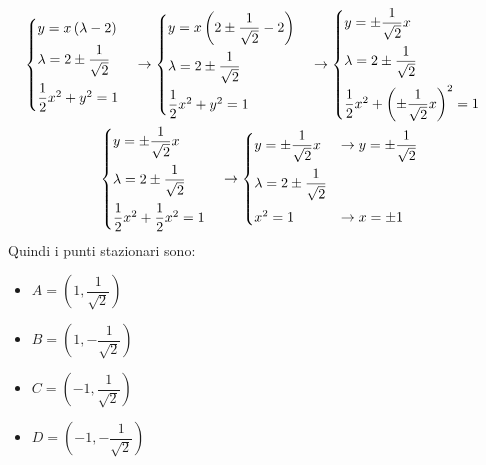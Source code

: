 \documentclass[a4paper]{article}
\begin{document}
	\begin{gather*}
		\begin{cases}
			y = x\left(\lambda - 2\right) \vspace{.5em}\\
			\lambda = 2 \pm \dfrac{1}{\sqrt{2}} \vspace{.5em}\\
			\dfrac{1}{2}x^{2} + y^{2} = 1
		\end{cases}
		\rightarrow
		\begin{cases}
			y = x\left(2 \pm \dfrac{1}{\sqrt{2}} - 2\right) \vspace{.5em}\\
			\lambda = 2 \pm \dfrac{1}{\sqrt{2}} \vspace{.5em}\\
			\dfrac{1}{2}x^{2} + y^{2} = 1
		\end{cases}
		\rightarrow
		\begin{cases}
			y = \pm \dfrac{1}{\sqrt{2}}x \vspace{.5em}\\
			\lambda = 2 \pm \dfrac{1}{\sqrt{2}} \vspace{.5em}\\
			\dfrac{1}{2}x^{2} + \left(\pm \dfrac{1}{\sqrt{2}}x\right)^{2} = 1
		\end{cases}
		\\
		\begin{cases}
			y = \pm \dfrac{1}{\sqrt{2}}x \vspace{.5em}\\
			\lambda = 2 \pm \dfrac{1}{\sqrt{2}} \vspace{.5em}\\
			\dfrac{1}{2}x^{2} + \dfrac{1}{2}x^{2} = 1
		\end{cases}
		\rightarrow
		\begin{cases}
			y = \pm \dfrac{1}{\sqrt{2}}x & \rightarrow y = \pm \dfrac{1}{\sqrt{2}}\vspace{.5em}\\
			\lambda = 2 \pm \dfrac{1}{\sqrt{2}} \vspace{.5em}\\
			x^{2} = 1 & \rightarrow x = \pm 1
		\end{cases}
	\end{gather*}
	Quindi i punti stazionari sono:
	\begin{multicols}{2}
		\begin{itemize}
			\item $A = \left(1, \dfrac{1}{\sqrt{2}}\right)$
			\item $B = \left(1, -\dfrac{1}{\sqrt{2}}\right)$
			\item $C = \left(-1, \dfrac{1}{\sqrt{2}}\right)$
			\item $D = \left(-1, -\dfrac{1}{\sqrt{2}}\right)$
		\end{itemize}
	\end{multicols}
\end{document}
